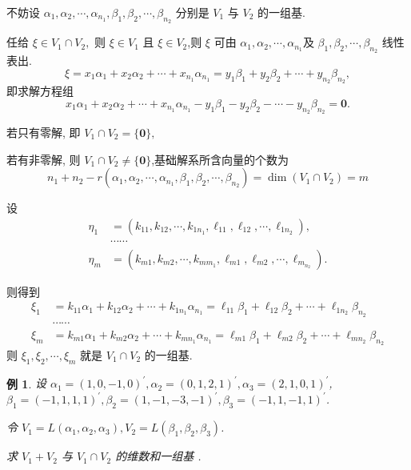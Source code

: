 \documentclass[13pt]{beamer}
\newtheorem{exa}{例}
\def\0{\mathbf{0}}
\begin{document}
\begin{frame}
不妨设 $\alpha_{1}, \alpha_{2}, \cdots, \alpha_{n_{1}}, \beta_{1}, \beta_{2}, \cdots, \beta_{n_{2}}$ 分别是 $V_{1}$ 与 $V_{2}$ 的一组基.


任给 $\xi \in V_{1} \cap V_{2},$ 则 $\xi \in V_{1}$ 且 $\xi \in V_{2}$,则 $\xi$ 可由 $\alpha_{1}, \alpha_{2}, \cdots, \alpha_{n_{1}}$及 $\beta_{1}, \beta_{2}, \cdots, \beta_{n_{2}}$ 线性表出.
$$\xi=x_{1} \alpha_{1}+x_{2} \alpha_{2}+\cdots+x_{n_{1}} \alpha_{n_{1}}=y_{1} \beta_{1}+y_{2} \beta_{2}+\cdots+y_{n_{2}} \beta_{n_{2}},$$ 即求解方程组
$$x_{1} \alpha_{1}+x_{2} \alpha_{2}+\cdots+x_{n_{1}} \alpha_{n_{1}}-y_{1} \beta_{1}-y_{2} \beta_{2}-\cdots-y_{n_{2}} \beta_{n_{2}}=\0.$$

若只有零解, 即 $V_{1} \cap V_{2}=\{\0\},$ 

若有非零解, 则 $V_{1} \cap V_{2} \neq\{\0\}$,基础解系所含向量的个数为
$$n_{1}+n_{2}-r \left(\alpha_{1}, \alpha_{2}, \cdots, \alpha_{n_{1}}, \beta_{1}, \beta_{2}, \cdots, \beta_{n_{2}}\right)=\operatorname{dim}\left(V_{1} \cap V_{2}\right)=m$$
\end{frame}


\begin{frame}

设
\begin{align*}
	\eta_{1}  &=\left(k_{11}, k_{12}, \cdots, k_{1 n_{1}}, \ell_{11}, \ell_{12}, \cdots, \ell_{1 n_{2}}\right), \\
	 			 &\cdots \cdots \\
	\eta_{m} & =\left(k_{m 1}, k_{m 2}, \cdots, k_{m m_{1}}, \ell_{m 1}, \ell_{m 2}, \cdots, \ell_{m_{n_{2}}}\right).
\end{align*}


 则得到
\begin{align*}
\xi_{1}& =k_{11} \alpha_{1}+k_{12} \alpha_{2}+\cdots+k_{1 n_{1}} \alpha_{n_{1}}=\ell_{11} \beta_{1}+\ell_{12} \beta_{2}+\cdots+\ell_{1 n_{2}} \beta_{n_{2}}\\
  	 &\cdots \cdots\\
\xi_{m}& =k_{m 1} \alpha_{1}+k_{m 2} \alpha_{2}+\cdots+k_{m n_{1}} \alpha_{n_{1}}=\ell_{m 1} \beta_{1}+\ell_{m 2} \beta_{2}+\cdots+\ell_{m n_{2}} \beta_{n_{2}}
\end{align*}
 { 则 } $\xi_{1}, \xi_{2}, \cdots, \xi_{m}$ 
 { 就是 } $V_{1} \cap V_{2} $ { 的一组基. } 

\end{frame}

\begin{frame}
\begin{exa}
设 
$\alpha_{1}=(1,0,-1,0)^{\prime}, \alpha_{2}=(0,1,2,1)^{\prime}, \alpha_{3}=(2,1,0,1)^{\prime}$, 
\quad $\beta_{1}=(-1,1,1,1)^{\prime}, \beta_{2}=(1,-1,-3,-1)^{\prime}, \beta_{3}=(-1,1,-1,1)^{\prime}$.

令 $V_{1}=L\left(\alpha_{1}, \alpha_{2}, \alpha_{3}\right), V_{2}=L\left(\beta_{1}, \beta_{2}, \beta_{3}\right)$.

求  $V_{1}+V_{2}$ { 与 } $V_{1} \cap V_{2}${ 的维数和一组基 }.
\end{exa} 



\end{frame}
\end{document}

